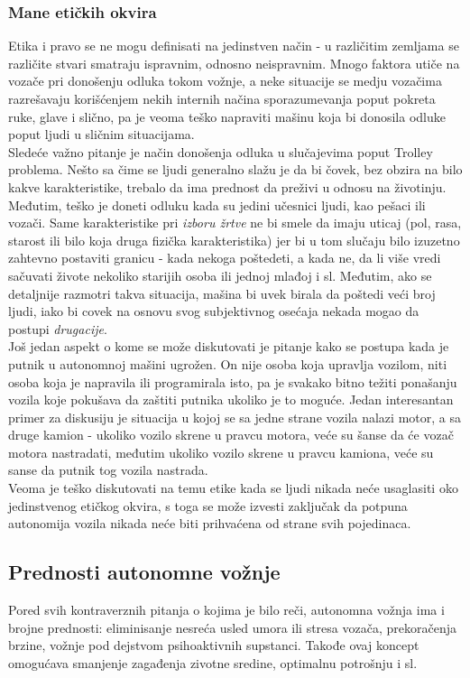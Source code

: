 \documentclass[a4paper]{article}
\begin{document}
\subsubsection{Mane etičkih okvira}
\label{subsubsec:Mane etičkih okvira}
Etika i pravo se ne mogu definisati na jedinstven način - u različitim zemljama se različite stvari smatraju ispravnim, odnosno neispravnim. Mnogo faktora utiče na vozače pri donošenju odluka tokom vožnje, a neke situacije se medju vozačima razrešavaju korišćenjem nekih internih načina sporazumevanja poput pokreta ruke, glave i slično, pa je veoma teško napraviti mašinu koja bi donosila odluke poput ljudi u sličnim situacijama. \\
Sledeće važno pitanje je način donošenja odluka u slučajevima poput Trolley problema. Nešto sa čime se ljudi generalno slažu je da bi čovek, bez obzira na bilo kakve karakteristike, trebalo da ima prednost da preživi u odnosu na životinju. Međutim, teško je doneti odluku kada su jedini učesnici ljudi, kao pešaci ili vozači. Same karakteristike pri \emph{izboru žrtve} ne bi smele da imaju uticaj (pol, rasa, starost ili bilo koja druga fizička karakteristika) jer bi u tom slučaju bilo izuzetno zahtevno postaviti granicu - kada nekoga poštedeti, a kada ne, da li više vredi sačuvati živote nekoliko starijih osoba ili jednoj mlađoj i sl. Međutim, ako se detaljnije razmotri takva situacija, mašina bi uvek birala da poštedi veći broj ljudi, iako bi covek na osnovu svog subjektivnog osećaja nekada mogao da postupi \emph{drugacije}. \\
Još jedan aspekt o kome se može diskutovati je pitanje kako se postupa kada je putnik u autonomnoj mašini ugrožen. On nije osoba koja upravlja vozilom, niti osoba koja je napravila ili programirala isto, pa je svakako bitno težiti ponašanju vozila koje pokušava da zaštiti putnika ukoliko je to moguće. Jedan interesantan primer za diskusiju je situacija u kojoj se sa jedne strane vozila nalazi motor, a sa druge kamion - ukoliko vozilo skrene u pravcu motora, veće su šanse da će vozač motora nastradati, međutim ukoliko vozilo skrene u pravcu kamiona, veće su sanse da putnik tog vozila nastrada. \\
Veoma je teško diskutovati na temu etike kada se ljudi nikada neće usaglasiti oko jedinstvenog etičkog okvira, s toga se može izvesti zaključak da potpuna autonomija vozila nikada neće biti prihvaćena od strane svih pojedinaca.

\subsection{Prednosti autonomne vožnje}
\label{subsec:Prednosti autonomne vožnje}
Pored svih kontraverznih pitanja o kojima je bilo reči, autonomna vožnja ima i brojne prednosti: eliminisanje nesreća usled umora ili stresa vozača, prekoračenja brzine, vožnje pod dejstvom psihoaktivnih supstanci. Takođe ovaj koncept omogućava smanjenje zagađenja zivotne sredine, optimalnu potrošnju i sl.
\end{document}

